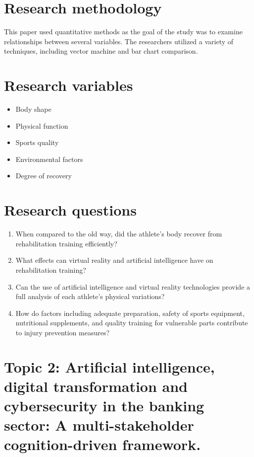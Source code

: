 \documentclass{article}
\begin{document}
\section*{Research methodology}
This paper used quantitative methods as the goal of the study was to examine relationships between several variables. The researchers utilized a variety of techniques, including vector machine and bar chart comparison.
\section*{Research variables}
\begin{itemize}
  \item Body shape
  \item Physical function
  \item Sports quality
  \item Environmental factors
  \item Degree of recovery
\end{itemize}
\section*{Research questions}
\begin{enumerate}
  \item When compared to the old way, did the athlete's body recover from rehabilitation training efficiently?
  \item What effects can virtual reality and artificial intelligence have on rehabilitation training?
  \item Can the use of artificial intelligence and virtual reality technologies provide a full analysis of each athlete's physical variations?
  \item How do factors including adequate preparation, safety of sports equipment, nutritional supplements, and quality training for vulnerable parts contribute to injury prevention measures?
\end{enumerate}
\pagebreak
\section*{Topic 2: Artificial intelligence, digital transformation and cybersecurity in the banking sector: A multi-stakeholder cognition-driven framework.}
\end{document}
